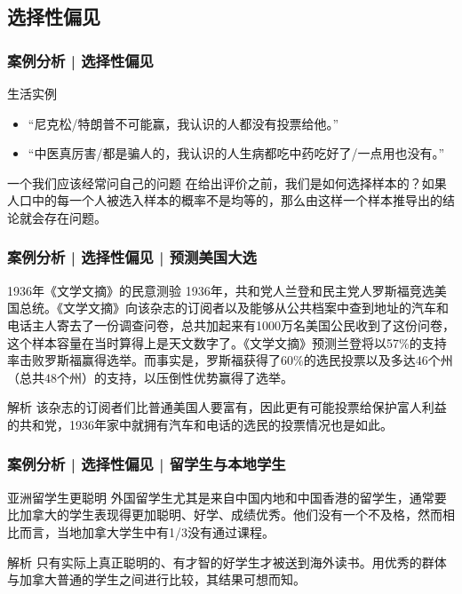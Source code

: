 \subsection{选择性偏见}
\begin{frame}
  \frametitle{案例分析 | 选择性偏见}
  \begin{block}{生活实例}
    \begin{itemize}
      \item “尼克松/特朗普不可能赢，我认识的人都没有投票给他。”
      \item “中医真厉害/都是骗人的，我认识的人生病都吃中药吃好了/一点用也没有。”
    \end{itemize}
  \end{block}
  \pause
  \begin{block}{一个我们应该经常问自己的问题}
    在给出评价之前，我们是如何选择样本的？如果人口中的每一个人被选入样本的概率不是均等的，那么由这样一个样本推导出的结论就会存在问题。
  \end{block}
\end{frame}

\begin{frame}
  \frametitle{案例分析 | 选择性偏见 | 预测美国大选}
  \begin{block}{1936年《文学文摘》的民意测验}
    1936年，共和党人兰登和民主党人罗斯福竞选美国总统。《文学文摘》向该杂志的订阅者以及能够从公共档案中查到地址的汽车和电话主人寄去了一份调查问卷，总共加起来有1000万名美国公民收到了这份问卷，这个样本容量在当时算得上是天文数字了。《文学文摘》预测兰登将以57\%的支持率击败罗斯福赢得选举。而事实是，罗斯福获得了60\%的选民投票以及多达46个州（总共48个州）的支持，以压倒性优势赢得了选举。
  \end{block}
  \pause \pause \pause \pause
  \begin{block}{解析}
    该杂志的订阅者们比普通美国人要富有，因此更有可能投票给保护富人利益的共和党，1936年家中就拥有汽车和电话的选民的投票情况也是如此。
  \end{block}
\end{frame}

\begin{frame}
  \frametitle{案例分析 | 选择性偏见 | 留学生与本地学生}
  \begin{block}{亚洲留学生更聪明}
    外国留学生尤其是来自中国内地和中国香港的留学生，通常要比加拿大的学生表现得更加聪明、好学、成绩优秀。他们没有一个不及格，然而相比而言，当地加拿大学生中有1/3没有通过课程。
  \end{block}
  \pause \pause \pause \pause
  \begin{block}{解析}
    只有实际上真正聪明的、有才智的好学生才被送到海外读书。用优秀的群体与加拿大普通的学生之间进行比较，其结果可想而知。
  \end{block}
\end{frame}

